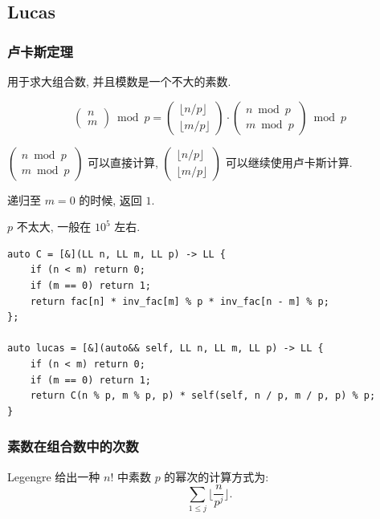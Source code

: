 \documentclass[UTF8, a4paper, titlepage, twoside]{ctexart}
\begin{document}
\subsection{ Lucas }
\subsubsection*{ 卢卡斯定理 }

用于求大组合数, 并且模数是一个不大的素数.

\[
\left( \begin{array}{c} n \\ m \end{array} \right) \bmod p
= \left( \begin{array}{c} \lfloor n / p\rfloor \\ \lfloor m / p\rfloor \end{array} \right)
\cdot \left( \begin{array}{c} n \bmod p \\ m \bmod p \end{array} \right) \bmod p
\]

\(\left( \begin{array}{c} n \bmod p \\ m \bmod p \end{array} \right)\) 可以直接计算, 
\(\left( \begin{array}{c} \lfloor n / p \rfloor \\ \lfloor m / p \rfloor \end{array}\right)\) 可以继续使用卢卡斯计算.

递归至 \(m = 0\) 的时候, 返回 \(1\). 

\(p\) 不太大, 一般在 \(10^5\) 左右.

\begin{lstlisting}[style=cpp]
auto C = [&](LL n, LL m, LL p) -> LL {
    if (n < m) return 0;
    if (m == 0) return 1;
    return fac[n] * inv_fac[m] % p * inv_fac[n - m] % p;
};

auto lucas = [&](auto&& self, LL n, LL m, LL p) -> LL {
    if (n < m) return 0;
    if (m == 0) return 1;
    return C(n % p, m % p, p) * self(self, n / p, m / p, p) % p;
}
\end{lstlisting}

\subsubsection*{ 素数在组合数中的次数 }

Legengre 给出一种 $n!$ 中素数 $p$ 的幂次的计算方式为:
\[
\sum_{1 \leqslant j} \lfloor \frac{n}{p^j} \rfloor.
\]
\end{document}
